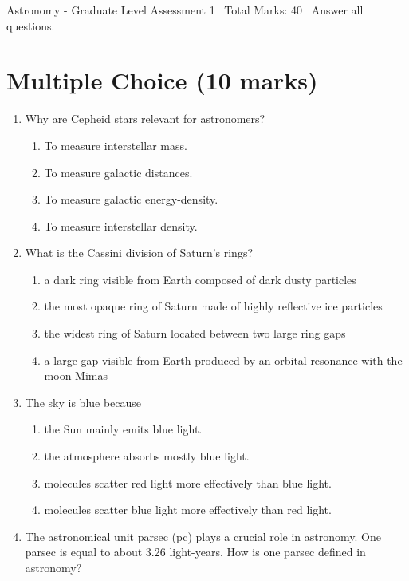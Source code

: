 \documentclass[12pt]{article}
\begin{document}
\begin{center}
Astronomy - Graduate Level Assessment 1 \
Total Marks: 40 \
Answer all questions.
\end{center}

\section*{Multiple Choice (10 marks)}
\begin{enumerate}[label=\arabic*.]
\item Why are Cepheid stars relevant for astronomers?
\begin{enumerate}[label=(\alph*)]
    \item To measure interstellar mass.
    \item To measure galactic distances.
    \item To measure galactic energy-density.
    \item To measure interstellar density.
\end{enumerate}
\item What is the Cassini division of Saturn's rings?
\begin{enumerate}[label=(\alph*)]
    \item a dark ring visible from Earth composed of dark dusty particles
    \item the most opaque ring of Saturn made of highly reflective ice particles
    \item the widest ring of Saturn located between two large ring gaps
    \item a large gap visible from Earth produced by an orbital resonance with the moon Mimas
\end{enumerate}
\item The sky is blue because
\begin{enumerate}[label=(\alph*)]
    \item the Sun mainly emits blue light.
    \item the atmosphere absorbs mostly blue light.
    \item molecules scatter red light more effectively than blue light.
    \item molecules scatter blue light more effectively than red light.
\end{enumerate}
\item The astronomical unit parsec (pc) plays a crucial role in astronomy. One parsec is equal to about 3.26 light-years. How is one parsec defined in astronomy?
\begin{enumerate}[label=(\alph*)]

\end{enumerate}
\end{enumerate}
\end{document}
